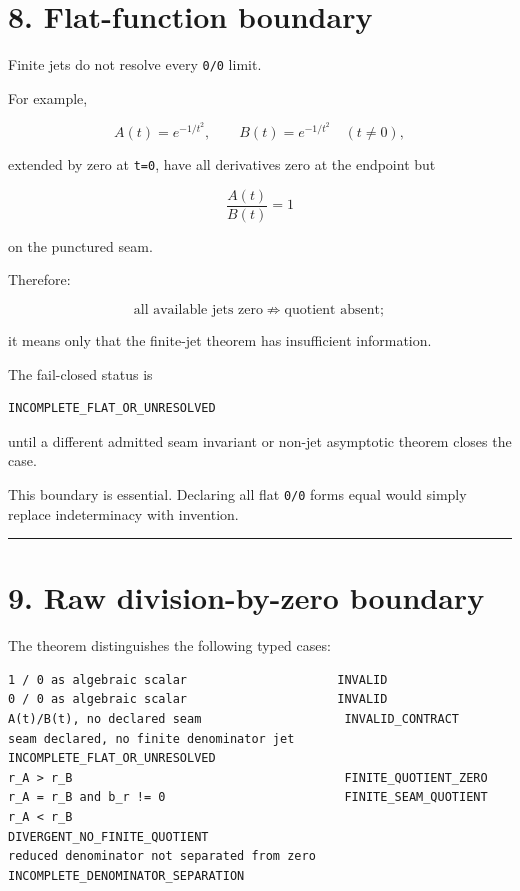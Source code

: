 \hypertarget{flat-function-boundary}{%
\section{8. Flat-function boundary}\label{flat-function-boundary}}

Finite jets do not resolve every \texttt{0/0} limit.

For example,

\[
A(t)=e^{-1/t^2},
\qquad
B(t)=e^{-1/t^2}
\quad(t\ne0),
\]

extended by zero at \texttt{t=0}, have all derivatives zero at the endpoint but

\[
\frac{A(t)}{B(t)}=1
\]

on the punctured seam.

Therefore:

\[
\boxed{
\text{all available jets zero}
\not\Rightarrow
\text{quotient absent};
}
\tag{8.1}
\]

it means only that the finite-jet theorem has insufficient information.

The fail-closed status is

\begin{verbatim}
INCOMPLETE_FLAT_OR_UNRESOLVED
\end{verbatim}

until a different admitted seam invariant or non-jet asymptotic theorem closes
the case.

This boundary is essential. Declaring all flat \texttt{0/0} forms equal would simply
replace indeterminacy with invention.

\begin{center}\rule{0.5\linewidth}{0.5pt}\end{center}

\hypertarget{raw-division-by-zero-boundary}{%
\section{9. Raw division-by-zero boundary}\label{raw-division-by-zero-boundary}}

The theorem distinguishes the following typed cases:

\begin{verbatim}
1 / 0 as algebraic scalar                     INVALID
0 / 0 as algebraic scalar                     INVALID
A(t)/B(t), no declared seam                    INVALID_CONTRACT
seam declared, no finite denominator jet       INCOMPLETE_FLAT_OR_UNRESOLVED
r_A > r_B                                      FINITE_QUOTIENT_ZERO
r_A = r_B and b_r != 0                         FINITE_SEAM_QUOTIENT
r_A < r_B                                      DIVERGENT_NO_FINITE_QUOTIENT
reduced denominator not separated from zero    INCOMPLETE_DENOMINATOR_SEPARATION
\end{verbatim}

